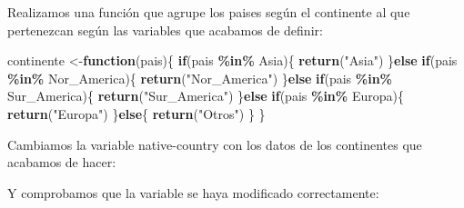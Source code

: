 \documentclass[]{article}
\newenvironment{Shaded}{\begin{snugshade}}{\end{snugshade}}
\newcommand{\ControlFlowTok}[1]{\textcolor[rgb]{0.13,0.29,0.53}{\textbf{#1}}}
\newcommand{\DataTypeTok}[1]{\textcolor[rgb]{0.13,0.29,0.53}{#1}}
\newcommand{\KeywordTok}[1]{\textcolor[rgb]{0.13,0.29,0.53}{\textbf{#1}}}
\newcommand{\NormalTok}[1]{#1}
\newcommand{\OperatorTok}[1]{\textcolor[rgb]{0.81,0.36,0.00}{\textbf{#1}}}
\newcommand{\StringTok}[1]{\textcolor[rgb]{0.31,0.60,0.02}{#1}}
\begin{document}
Realizamos una función que agrupe los paises según el continente al que
pertenezcan según las variables que acabamos de definir:

\begin{Shaded}
\begin{Highlighting}[]
\NormalTok{continente \textless{}{-}}\ControlFlowTok{function}\NormalTok{(pais)\{}
    \ControlFlowTok{if}\NormalTok{(pais }\OperatorTok{\%in\%}\StringTok{ }\NormalTok{Asia)\{}
      \KeywordTok{return}\NormalTok{(}\StringTok{"Asia"}\NormalTok{)}
\NormalTok{    \}}\ControlFlowTok{else} \ControlFlowTok{if}\NormalTok{(pais }\OperatorTok{\%in\%}\StringTok{ }\NormalTok{Nor\_America)\{}
      \KeywordTok{return}\NormalTok{(}\StringTok{"Nor\_America"}\NormalTok{)}
\NormalTok{    \}}\ControlFlowTok{else} \ControlFlowTok{if}\NormalTok{(pais }\OperatorTok{\%in\%}\StringTok{ }\NormalTok{Sur\_America)\{}
      \KeywordTok{return}\NormalTok{(}\StringTok{"Sur\_America"}\NormalTok{)}
\NormalTok{    \}}\ControlFlowTok{else} \ControlFlowTok{if}\NormalTok{(pais }\OperatorTok{\%in\%}\StringTok{ }\NormalTok{Europa)\{}
      \KeywordTok{return}\NormalTok{(}\StringTok{"Europa"}\NormalTok{)}
\NormalTok{    \}}\ControlFlowTok{else}\NormalTok{\{}
      \KeywordTok{return}\NormalTok{(}\StringTok{"Otros"}\NormalTok{)}
\NormalTok{    \}}
\NormalTok{\}}
\end{Highlighting}
\end{Shaded}

Cambiamos la variable native-country con los datos de los continentes
que acabamos de hacer:

\begin{Shaded}
\end{Shaded}

Y comprobamos que la variable se haya modificado correctamente:

\begin{Shaded}
\end{Shaded}
\end{document}
